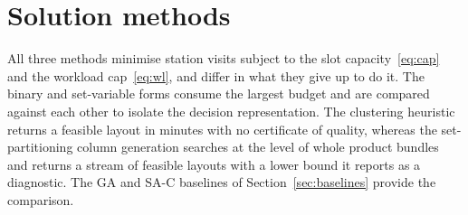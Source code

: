 \documentclass[]{interact}
\begin{document}
\section{Solution methods}\label{sec:methods}
All three methods minimise station visits subject to the slot capacity~\eqref{eq:cap} and the workload cap~\eqref{eq:wl}, and differ in what they give up to do it. The binary and set-variable forms consume the largest budget and are compared against each other to isolate the decision representation. The clustering heuristic returns a feasible layout in minutes with no certificate of quality, whereas the set-partitioning column generation searches at the level of whole product bundles and returns a stream of feasible layouts with a lower bound it reports as a diagnostic. The GA and SA-C baselines of Section~\ref{sec:baselines} provide the comparison.
\end{document}
